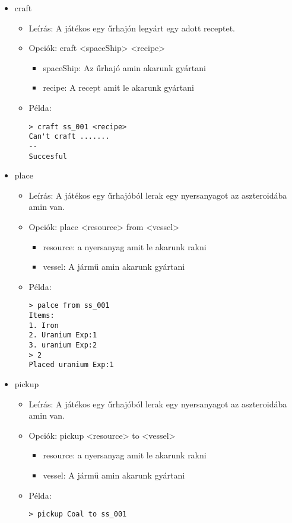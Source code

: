 \documentclass[../../projlab]{subfiles}
\begin{document}
\begin{itemize}
    \item craft
    \begin{itemize}
        \item Leírás: A játékos egy űrhajón legyárt egy adott receptet.
        \item Opciók: craft <spaceShip> <recipe>
        \begin{itemize}
            \item spaceShip: Az űrhajó amin akarunk gyártani
            \item recipe: A recept amit le akarunk gyártani
        \end{itemize}
        \item Példa:
            \begin{verbatim}
> craft ss_001 <recipe>
Can't craft .......
--
Succesful
            \end{verbatim}
    \end{itemize}


    \item place
    \begin{itemize}
        \item Leírás: A játékos egy űrhajóból lerak egy nyersanyagot az aszteroidába amin van.
        \item Opciók: place <resource> from <vessel>
        \begin{itemize}
            \item resource: a nyersanyag amit le akarunk rakni
            \item vessel: A jármű amin akarunk gyártani
        \end{itemize}
        \item Példa:
            \begin{verbatim}
> palce from ss_001
Items:
1. Iron
2. Uranium Exp:1
3. uranium Exp:2
> 2
Placed uranium Exp:1
            \end{verbatim}
    \end{itemize}

    \item pickup
    \begin{itemize}
        \item Leírás: A játékos egy űrhajóból lerak egy nyersanyagot az aszteroidába amin van.
        \item Opciók: pickup <resource> to <vessel>
        \begin{itemize}
            \item resource: a nyersanyag amit le akarunk rakni
            \item vessel: A jármű amin akarunk gyártani
        \end{itemize}
        \item Példa:
            \begin{verbatim}
> pickup Coal to ss_001
            \end{verbatim}
    \end{itemize}



\end{itemize}
\end{document}
